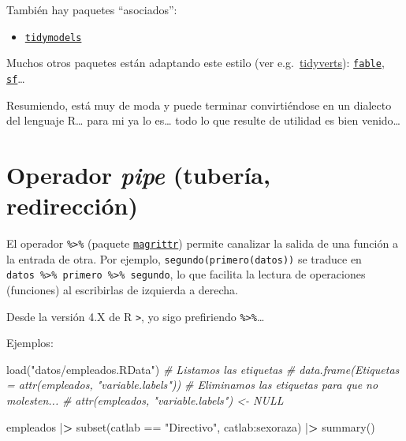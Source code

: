 \documentclass[
]{book}
\newenvironment{Shaded}{\begin{snugshade}}{\end{snugshade}}
\newcommand{\CommentTok}[1]{\textcolor[rgb]{0.56,0.35,0.01}{\textit{#1}}}
\newcommand{\ErrorTok}[1]{\textcolor[rgb]{0.64,0.00,0.00}{\textbf{#1}}}
\newcommand{\FunctionTok}[1]{\textcolor[rgb]{0.00,0.00,0.00}{#1}}
\newcommand{\NormalTok}[1]{#1}
\newcommand{\SpecialCharTok}[1]{\textcolor[rgb]{0.00,0.00,0.00}{#1}}
\newcommand{\StringTok}[1]{\textcolor[rgb]{0.31,0.60,0.02}{#1}}
\providecommand{\tightlist}{%
  \setlength{\itemsep}{0pt}\setlength{\parskip}{0pt}}
\theoremstyle{break}
\theoremstyle{nonumberplain}
\begin{document}
También hay paquetes ``asociados'':

\begin{itemize}
\tightlist
\item
  \href{https://tidymodels.tidymodels.org}{\texttt{tidymodels}}
\end{itemize}

Muchos otros paquetes están adaptando este estilo (ver e.g.~\href{https://tidyverts.org/}{tidyverts}): \href{https://fable.tidyverts.org}{\texttt{fable}}, \href{https://r-spatial.github.io/sf/}{\texttt{sf}}\ldots{}

Resumiendo, está muy de moda y puede terminar convirtiéndose en un dialecto del lenguaje R\ldots{} para mi ya lo es\ldots{} todo lo que resulte de utilidad es bien venido\ldots{}

\hypertarget{pipe}{%
\section{\texorpdfstring{Operador \emph{pipe} (tubería, redirección)}{Operador pipe (tubería, redirección)}}\label{pipe}}

El operador \texttt{\%\textgreater{}\%} (paquete \href{https://magrittr.tidyverse.org}{\texttt{magrittr}}) permite canalizar la salida de una función a la entrada de otra.
Por ejemplo, \texttt{segundo(primero(datos))} se traduce en \texttt{datos\ \%\textgreater{}\%\ primero\ \%\textgreater{}\%\ segundo}, lo que facilita la lectura de operaciones (funciones) al escribirlas de izquierda a derecha.

Desde la versión 4.X de R \texttt{\textbar{}\textgreater{}}, yo sigo prefiriendo \texttt{\%\textgreater{}\%}\ldots{}

Ejemplos:

\begin{Shaded}
\begin{Highlighting}[]
\FunctionTok{load}\NormalTok{(}\StringTok{"datos/empleados.RData"}\NormalTok{)}
\CommentTok{\# Listamos las etiquetas}
\CommentTok{\# data.frame(Etiquetas = attr(empleados, "variable.labels"))  }
\CommentTok{\# Eliminamos las etiquetas para que no molesten...}
\CommentTok{\# attr(empleados, "variable.labels") \textless{}{-} NULL  }

\NormalTok{empleados }\SpecialCharTok{|}\ErrorTok{\textgreater{}}  \FunctionTok{subset}\NormalTok{(catlab }\SpecialCharTok{==} \StringTok{"Directivo"}\NormalTok{, catlab}\SpecialCharTok{:}\NormalTok{sexoraza) }\SpecialCharTok{|}\ErrorTok{\textgreater{}}  \FunctionTok{summary}\NormalTok{()}
\end{Highlighting}
\end{Shaded}
\end{document}
